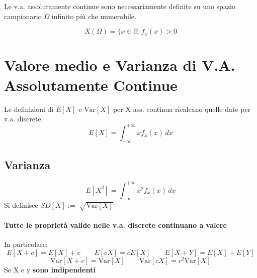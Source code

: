 \documentclass[12pt, a4paper, openany]{book}
\begin{document}
Le v.a. assolutamente continue sono necessariamente definite su uno spazio campionario
$\Omega$ infinito più che numerabile.

\begin{equation*}
    X(\Omega) = \{ x \in \mathbb{R} : f_x (x) > 0
\end{equation*}

\section{Valore medio e Varianza di V.A. Assolutamente Continue}
Le definizioni di $E[X]$ e $\text{Var}[X]$ per X ass. continua ricalcano quelle date per
v.a. discrete.
\begin{equation*}
    E[X] = \int_{-\infty}^{+\infty} x f_x(x) \,dx 
\end{equation*}
\subsection*{Varianza}
\begin{equation*}
    E[X^2] = \int_{-\infty}^{+\infty} x^2 f_x(x) \,dx
\end{equation*}
Si definisce $SD[X] := \sqrt[]{\text{Var}[X]}$
\paragraph*{Tutte le proprietà valide nelle v.a. discrete continuano a valere}
In particolare:
\begin{equation*}
    E[X+c] = E[X] + c \qquad E[cX] = cE[X] \qquad E[X+Y] = E[X] + E[Y]
\end{equation*}
\begin{equation*}
    \text{Var}[X+c] = \text{Var}[X] \qquad \text{Var}[cX] = c^2 \text{Var}[X]
\end{equation*}
Se X e y \textbf{sono indipendenti}
\end{document}

